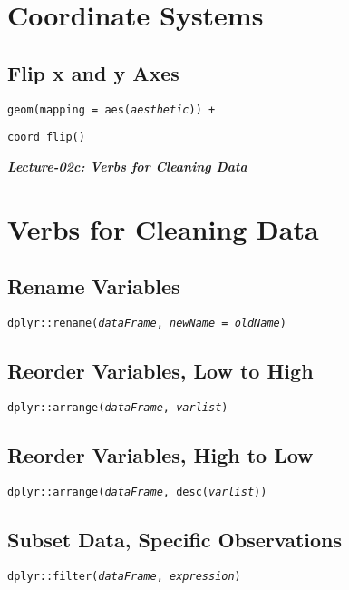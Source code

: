 \documentclass{tufte-handout}
\begin{document}
\vspace{5mm}
\section{Coordinate Systems}
\subsection{Flip x and y Axes}
{\color{red}\texttt{geom}}\texttt{(mapping = aes(\textit{aesthetic})) +}
\par \noindent \hspace{5mm} {\color{red}\texttt{coord\_flip()}}

\newpage
\begin{center}
{\Large\textit{\textbf{Lecture-02c: Verbs for Cleaning Data}}}
\end{center}

\section{Verbs for Cleaning Data}
\subsection{Rename Variables}
\texttt{dplyr::}{\color{red}\texttt{rename}}\texttt{(\textit{dataFrame}, \textit{newName} = \textit{oldName})}

\vspace{3mm}
\subsection{Reorder Variables, Low to High}
\texttt{dplyr::}{\color{red}\texttt{arrange}}\texttt{(\textit{dataFrame}, \textit{varlist})}

\vspace{3mm}
\subsection{Reorder Variables, High to Low}
\texttt{dplyr::}{\color{red}\texttt{arrange}}\texttt{(\textit{dataFrame}, desc(\textit{varlist}))}

\vspace{3mm}
\subsection{Subset Data, Specific Observations}
\texttt{dplyr::}{\color{red}\texttt{filter}}\texttt{(\textit{dataFrame}, \textit{expression})}
\end{document}
